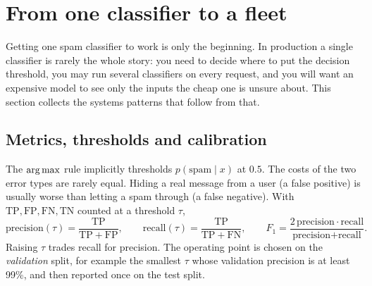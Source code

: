 \section{From one classifier to a fleet}\label{sec:classify:fleet}

Getting one spam classifier to work is only the beginning. In production a single classifier is
rarely the whole story: you need to decide where to put the decision threshold, you may
run several classifiers on every request, and you will want an expensive model to see
only the inputs the cheap one is unsure about. This section collects the systems
patterns that follow from that.

\subsection{Metrics, thresholds and calibration}

The $\operatorname*{arg\,max}$ rule implicitly thresholds $p(\text{spam}\mid x)$ at $0.5$. The costs of
the two error types are rarely equal. Hiding a real message from a user (a false
positive) is usually worse than letting a spam through (a false negative). With
$\mathrm{TP},\mathrm{FP},\mathrm{FN},\mathrm{TN}$ counted at a threshold $\tau$,
\begin{equation}
\text{precision}(\tau) = \frac{\mathrm{TP}}{\mathrm{TP}+\mathrm{FP}},\qquad
\text{recall}(\tau) = \frac{\mathrm{TP}}{\mathrm{TP}+\mathrm{FN}},\qquad
F_1 = \frac{2\,\text{precision}\cdot\text{recall}}{\text{precision}+\text{recall}}.
\label{eq:classify:prf}
\end{equation}
Raising $\tau$ trades recall for precision. The operating point is chosen on the
\emph{validation} split, for example the smallest $\tau$ whose validation precision is
at least 99\%, and then reported once on the test split.

